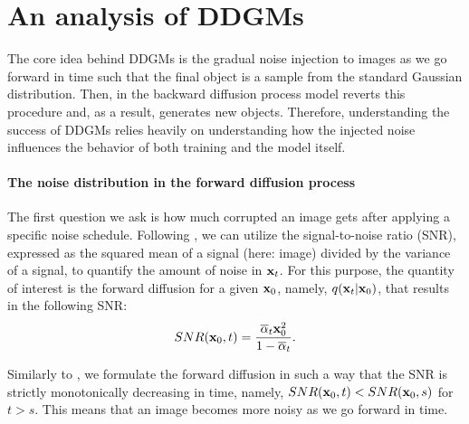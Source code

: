 
\section{An analysis of DDGMs \label{sec:analysis}}

The core idea behind DDGMs is the gradual noise injection to images as we go forward in time such that the final object is a sample from the standard Gaussian distribution. Then, in the backward diffusion process model reverts this procedure and, as a result, generates new objects. Therefore, understanding the success of DDGMs relies heavily on understanding how the injected noise influences the behavior of both training and the model itself.

\paragraph{The noise distribution in the forward diffusion process} The first question we ask is how much corrupted an image gets after applying a specific noise schedule. Following %
\citet{ho2020denoising, kingma2021variational, nichol2021improved}, we can utilize the signal-to-noise ratio (SNR), expressed as the squared mean of a signal (here: image) divided by the variance of a signal, to quantify the amount of noise in ${\mathbf{x}}_t$. For this purpose, the quantity of interest is the forward diffusion for a given ${\mathbf{x}}_0$, namely, $q({\mathbf{x}}_t | {\mathbf{x}}_0)$, that results in the following SNR:
\begin{equation}\label{eq:snr}
    SNR(\rvx_0, t) = \frac{\overline{\alpha}_t \rvx_0^2}{1 - \overline{\alpha}_t} .
\end{equation}

Similarly to \citet{kingma2021variational}, we formulate the forward diffusion in such a way that the SNR is strictly monotonically decreasing in time, namely, $SNR({\mathbf{x}}_0, t) < SNR({\mathbf{x}}_0, s)$ for $t > s$. This means that an image becomes more noisy as we go forward in time. 

